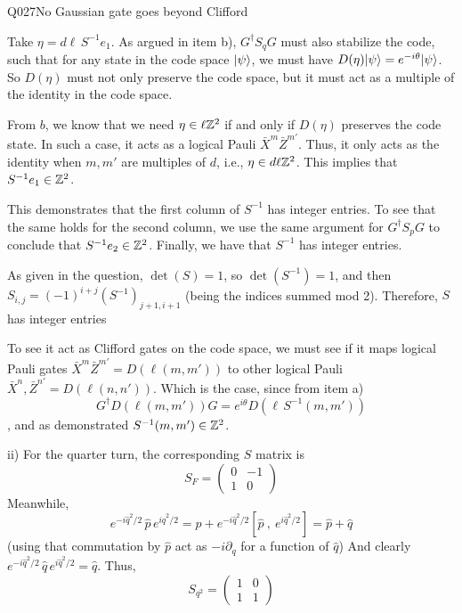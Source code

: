 \begin{entry}{Q027}{No Gaussian gate goes beyond Clifford}
\begin{solution}[Part (c)]
Take $\eta = d\ell \,S^{-1}e_1$. As argued in item b), $G^\dagger S_q G$ must also stabilize the code, such that for any state in the code space $\lvert \psi \rangle$, we must have $D(\eta)\lvert \psi \rangle = e^{-i\theta}\lvert \psi \rangle$. So $D(\eta)$ must not only preserve the code space, but it must act as a multiple of the identity in the code space. 

From $b$, we know that we need $\eta \in \ell \mathbb{Z}^2$ if and only if $D(\eta)$ preserves the code state. In such a case, it acts as a logical Pauli $\bar X^m \bar Z^{m'}$. Thus, it only acts as the identity when $m,m'$ are multiples of $d$, i.e., $\eta \in d\ell \mathbb{Z}^2$. This implies that $S^{-1}e_1 \in \mathbb{Z}^2$.

This demonstrates that the first column of $S^{-1}$ has integer entries. To see that the same holds for the second column, we use the same argument for $ G^\dagger S_p G$ to conclude that $S^{-1}e_2 \in \mathbb{Z}^2$. Finally, we have that $S^{-1}$ has integer entries.

As given in the question, $\det(S)=1$, so $\det(S^{-1})=1$, and then $S_{i,j}=(-1)^{i+j}(S^{-1})_{j+1,i+1}$ (being the indices summed mod 2). Therefore, $S$ has integer entries 

To see it act as Clifford gates on the code space, we must see if it maps logical Pauli gates $\bar X^m\bar Z^{m'}= D(\ell (m,m'))$ to other logical Pauli $\bar X^n,\bar Z^{n'}= D(\ell (n,n'))$. Which is the case, since from item a) 
$$G^\dagger D(\ell (m,m'))G = e^{i\theta } D(\ell\, S^{-1}(m,m'))$$, and as demonstrated $S^{-1}(m,m')\in \mathbb{Z}^2$.

ii) For the quarter turn, the corresponding $S$ matrix is
\begin{equation}
    S_F = \begin{pmatrix}
        0& -1\\
        1 & 0
    \end{pmatrix}
\end{equation}
Meanwhile, 
\begin{equation}
   e^{-i\hat q^2/2}\, \hat p\, e^{i\hat q^2/2} = \hat p + e^{-i\hat q^2/2}[\hat p\ ,\ e^{i\hat q^2/2}] = \hat p + \hat q
\end{equation}
(using that commutation by $\hat p$ act as $-i\partial_q$ for a function of $\hat q$)
And clearly $e^{-i\hat q^2/2}\, \hat q\, e^{i\hat q^2/2} = \hat q$. Thus, 
\begin{equation}
    S_{q^2} = \begin{pmatrix}
        1& 0\\
        1& 1
    \end{pmatrix}
\end{equation}


\end{solution}
\end{entry}
